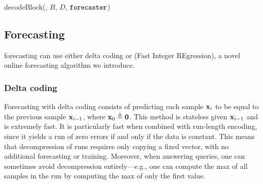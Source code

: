 \begin{algorithm}[h]
\caption{decodeBlock(\bytes, $B$, $D$, $\texttt{forecaster}$)}
\label{algo:decomp}
\begin{algorithmic}[1]


 
    \EndFor
\Else {}
\EndFor
\EndIf
\end{algorithmic}
\end{algorithm}

\subsection{Forecasting}

\minesp forecasting can use either delta coding or \justfire \text{ } (Fast Integer REgression), a novel online forecasting algorithm we introduce.

\subsubsection{Delta coding}

Forecasting with delta coding consists of predicting each sample $\mathbf{x}_i$ to be equal to the previous sample $\mathbf{x}_{i-1}$, where $\mathbf{x}_{0} \triangleq \mathbf{0}$. This method is stateless given $\mathbf{x}_{i-1}$ and is extremely fast. It is particularly fast when combined with run-length encoding, since it yields a run of zero errors if and only if the data is constant. This means that decompression of runs requires only copying a fixed vector, with no additional forecasting or training. Moreover, when answering queries, one can sometimes avoid decompression entirely---e.g., one can compute the max of all samples in the run by computing the max of only the first value.

